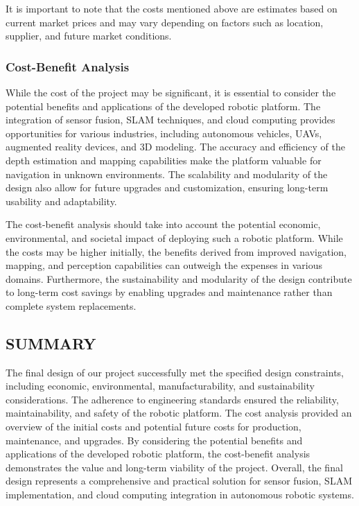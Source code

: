 \documentclass[12pt]{article}
\begin{document}
        It is important to note that the costs mentioned above are estimates based on current market prices and may vary depending on factors such as location, supplier, and future market conditions.

        \subsubsection{Cost-Benefit Analysis}

        While the cost of the project may be significant, it is essential to consider the potential benefits and applications of the developed robotic platform. The integration of sensor fusion, SLAM techniques, and cloud computing provides opportunities for various industries, including autonomous vehicles, UAVs, augmented reality devices, and 3D modeling. The accuracy and efficiency of the depth estimation and mapping capabilities make the platform valuable for navigation in unknown environments. The scalability and modularity of the design also allow for future upgrades and customization, ensuring long-term usability and adaptability.

        The cost-benefit analysis should take into account the potential economic, environmental, and societal impact of deploying such a robotic platform. While the costs may be higher initially, the benefits derived from improved navigation, mapping, and perception capabilities can outweigh the expenses in various domains. Furthermore, the sustainability and modularity of the design contribute to long-term cost savings by enabling upgrades and maintenance rather than complete system replacements.

    \subsection{SUMMARY}

    The final design of our project successfully met the specified design constraints, including economic, environmental, manufacturability, and sustainability considerations. The adherence to engineering standards ensured the reliability, maintainability, and safety of the robotic platform. The cost analysis provided an overview of the initial costs and potential future costs for production, maintenance, and upgrades. By considering the potential benefits and applications of the developed robotic platform, the cost-benefit analysis demonstrates the value and long-term viability of the project. Overall, the final design represents a comprehensive and practical solution for sensor fusion, SLAM implementation, and cloud computing integration in autonomous robotic systems.
\end{document}
